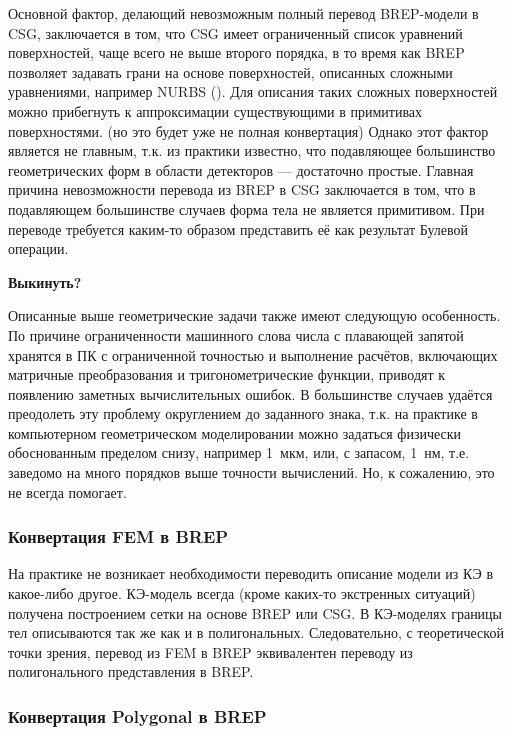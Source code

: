 Основной фактор, делающий невозможным полный перевод BREP-модели в CSG, заключается в том, что CSG имеет ограниченный список уравнений поверхностей, чаще всего не выше второго порядка, в то время как BREP позволяет задавать грани на основе поверхностей, описанных сложными уравнениями, например NURBS (\cite{}). Для описания таких сложных поверхностей можно прибегнуть к аппроксимации существующими в примитивах поверхностями. (\todo но это будет уже не полная конвертация)
Однако этот фактор является не главным, т.к. из практики известно, что подавляющее большинство геометрических форм в области детекторов --- достаточно простые.
Главная причина невозможности перевода из BREP в CSG заключается в том, что в подавляющем большинстве случаев форма тела не является примитивом. При переводе требуется каким-то образом представить её как результат Булевой операции.

\todo \textbf{Выкинуть?}

Описанные выше геометрические задачи также имеют следующую особенность. По причине ограниченности машинного слова числа с плавающей запятой хранятся в ПК с ограниченной точностью и выполнение расчётов, включающих матричные преобразования и тригонометрические функции, приводят к появлению заметных вычислительных ошибок. В большинстве случаев удаётся преодолеть эту проблему округлением до заданного знака, т.к. на практике в компьютерном геометрическом моделировании можно задаться физически обоснованным пределом снизу, например 1~мкм, или, с запасом, 1~нм, т.е. заведомо на много порядков выше точности вычислений. Но, к сожалению, это не всегда помогает.

\subsubsection{Конвертация FEM в BREP}\label{sec:secFEMtoBREP}

На практике не возникает необходимости переводить описание модели из КЭ в какое-либо другое. КЭ-модель всегда (кроме каких-то экстренных ситуаций) получена построением сетки на основе BREP или CSG.
В КЭ-моделях границы тел описываются так же как и в полигональных. Следовательно, с теоретической точки зрения, перевод из FEM в BREP эквивалентен переводу из полигонального представления в BREP.

\subsubsection{Конвертация Polygonal в BREP}\label{sec:secPolyToBREP}

